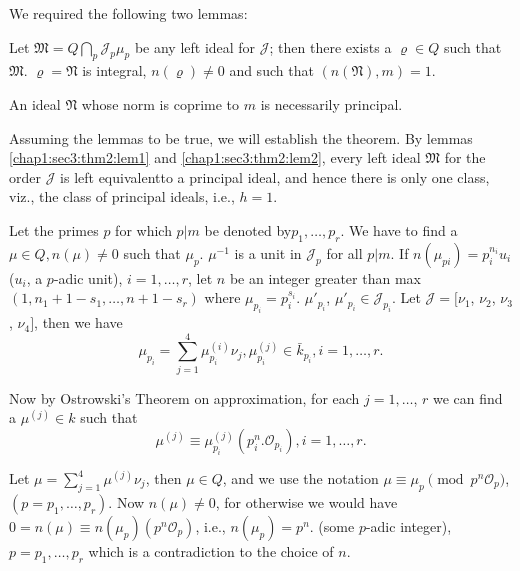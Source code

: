 We required the following two lemmas:
\setcounter{Lemma}{0}
\begin{Lemma}\label{chap1:sec3:thm2:lem1} %
  Let $\mathfrak{M}= Q \bigcap\limits_p \mathcal{J}_p \mu_p$ be any
  left ideal for $\mathcal{J}$; then there exists a $\varrho \in  Q$
  such that $\mathfrak{M}$. $\varrho= \mathfrak{N}$ is integral,
  $n(\varrho) \neq 0$ and such that $(n(\mathfrak{N}), m)=1$. 
\end{Lemma}
 
\begin{Lemma}\label{chap1:sec3:thm2:lem2} %
  An ideal $\mathfrak{N}$ whose norm is coprime to $m$ is necessarily
  principal. 
\end{Lemma} 
 
Assuming the lemmas to be true, we will establish the theorem. By
lemmas \ref{chap1:sec3:thm2:lem1} and
\ref{chap1:sec3:thm2:lem2}, every left ideal $\mathfrak{M}$ for the
order  
$\mathcal{J}$ is left equivalent\pageoriginale to a principal ideal,
and hence there is only one class, viz., the class of principal
ideals, i.e., $h=1$. 


\setcounter{proofoflemma}{0}
\begin{proofoflemma}\label{chap1:sec3:thm2:polem1}
  Let the primes $p$ for which $p|m$ be denoted by\break $p_1, \ldots,
  p_r$. We have to find a $\mu \in Q, n (\mu)\neq 0$ such that
  $\mu_p$. $\mu^{-1}$ is a unit in $\mathcal{J}_p$ for all $p|m$. If
  $n(\mu_{pi})= p_i^{n_i} u_i$ ($u_i$, a $p$-adic unit), $i=1, \ldots
  , r$, let $n$ be an integer greater than max $(1,n_1+ 1-s_1, \ldots,
  n+ 1-s_r)$ where $\mu_{p_i}= p_i^{s_i}$. $\mu'_{p_i}$,  $\mu'_{p_i}
  \in  \mathcal{J}_{p_i}$. Let $\mathcal{J}=[\nu_1$, $\nu_2$, $\nu_3$,
    $\nu_4]$, then we have  
  $$
  \mu_{p_i} = \sum_{j=1}^4 \mu^{(i)}_{p_i} \nu_j,  \mu^{(j)}_{p_i} \in
  \bar{k}_{p_i}, i=1, \dots,  r. 
  $$ 
\end{proofoflemma} 
 
Now by Ostrowski's Theorem on approximation, for each $j=1, \ldots$,
$r$ we can find a $\mu^{(j)} \in k$ such that  
$$
\mu^{(j)} \equiv \mu^{(j)}_{p_i} (p^n_i.  \mathscr{O}_{p_i}), i=1, \ldots,  r.
$$

Let $\mu= \sum\limits^{4}_{j=1} \mu^{(j)} \nu_j$, then $\mu \in Q$,
and we use the notation $\mu \equiv \mu_p \pmod {p^n \mathscr{O}_p}$,
$(p=p_1, \ldots,  p_r)$. Now $n(\mu) \neq 0$, for  otherwise we would
have $0=n(\mu) \equiv n(\mu_p) (p^n \mathscr{O}_p)$, i.e., $n(\mu_p)
=p^n$. (some $p$-adic integer),  $p=p_1, \ldots,  p_r$ which is a
contradiction to the choice of $n$. 

